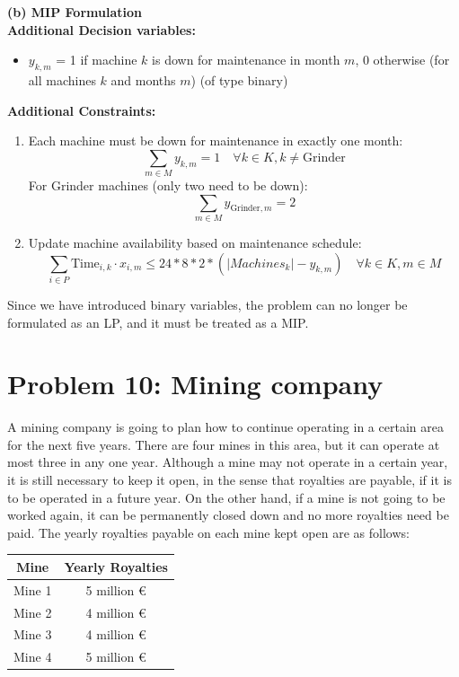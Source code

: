 \documentclass[a4paper,10pt]{article}
\begin{document}
\textbf{(b) MIP Formulation}\\

\textbf{Additional Decision variables:}
\begin{itemize}
  \item \(y_{k,m}\) = 1 if machine \(k\) is down for maintenance in month \(m\), 0 otherwise (for all machines \(k\) and months \(m\)) (of type binary) 
\end{itemize}

\textbf{Additional Constraints:}
\begin{enumerate}
  \item Each machine must be down for maintenance in exactly one month:
  \[\boxed{\sum_{m \in M} y_{k,m} = 1 \quad \forall k \in K, k \neq \text{Grinder}}\]
  For Grinder machines (only two need to be down):
  \[\boxed{\sum_{m \in M} y_{\text{Grinder},m} = 2}\]

  \item Update machine availability based on maintenance schedule:
  \[\boxed{\sum_{i \in P} \text{Time}_{i,k} \cdot x_{i,m} \leq 24*8*2*(|Machines_k| - y_{k,m}) \quad \forall k \in K, m \in M}\]

\end{enumerate}

Since we have introduced binary variables, the problem can no longer be formulated as an LP, and it must be treated as a MIP.


\newpage

\section*{Problem 10: Mining company}

A mining company is going to plan how to continue operating in a certain area for the next
five years. There are four mines in this area, but it can operate at most three in any one year.
Although a mine may not operate in a certain year, it is still necessary to keep it open, in the
sense that royalties are payable, if it is to be operated in a future year. On the other hand, if a
mine is not going to be worked again, it can be permanently closed down and no more royalties
need be paid. The yearly royalties payable on each mine kept open are as follows:

\begin{table}[H]
\centering
\begin{tabular}{|c|c|}
\hline
Mine & Yearly Royalties \\
\hline
Mine 1 & 5 million \euro \\
Mine 2 & 4 million \euro \\
Mine 3 & 4 million \euro \\
Mine 4 & 5 million \euro \\
\hline
\end{tabular}
\end{table}
\end{document}
